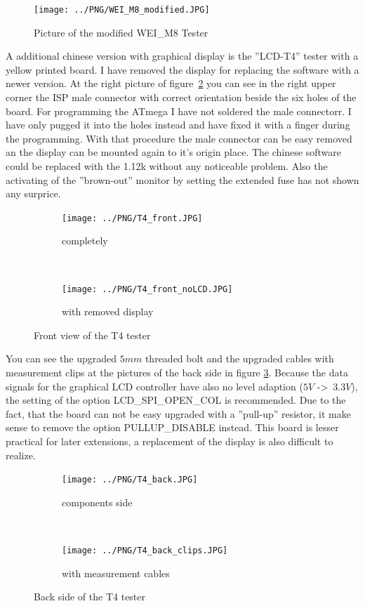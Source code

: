 \begin{figure}[H]
\centering
\texttt{[image: ../PNG/WEI\_M8\_modified.JPG]}
\caption{Picture of the modified WEI\_M8 Tester}
\label{fig:WeiM8mod}
\end{figure}

A additional chinese version with graphical display is the ''LCD-T4'' tester with a yellow 
printed board.
I have removed the display for replacing the software with a newer version.
At the right picture of figure~\ref{fig:T4_front} you can see in the right upper corner the ISP male connector
with correct orientation beside the six holes of the board.
For programming the ATmega I have not soldered the male connectorr. I have only pugged it into
the holes instead and have fixed it with a finger during the programming.
With that procedure the male connector can be easy removed an the display can be mounted again to
it's origin place.
The chinese software could be replaced with the 1.12k without any noticeable problem. 
Also the activating of the ''brown-out'' monitor by setting the extended fuse has not
shown any surprice.

\begin{figure}[H]
  \begin{subfigure}[b]{9cm}
    \centering
    \texttt{[image: ../PNG/T4\_front.JPG]}
    \caption{completely}
  \end{subfigure}
  ~
  \begin{subfigure}[b]{9cm}
    \centering
    \texttt{[image: ../PNG/T4\_front\_noLCD.JPG]}
    \caption{with removed display}
  \end{subfigure}
  \caption{Front view of the T4 tester}
  \label{fig:T4_front}
\end{figure}

You can see the upgraded \(5mm\) threaded bolt and the upgraded cables with measurement clips
at the pictures of the back side in figure \ref{fig:T4_back}.
Because the data signals for the graphical LCD controller have also no
level adaption (\(5V\) -\textgreater~\(3.3V\)), the setting of the option LCD\_SPI\_OPEN\_COL is recommended.
Due to the fact, that the board can not be easy upgraded with a ''pull-up'' resistor,
it make sense to remove the option PULLUP\_DISABLE instead. 
This board is lesser practical for later extensions, a replacement of the display is
also difficult to realize.

\begin{figure}[H]
  \begin{subfigure}[b]{9cm}
    \centering
    \texttt{[image: ../PNG/T4\_back.JPG]}
    \caption{components side}
  \end{subfigure}
  ~
  \begin{subfigure}[b]{9cm}
    \centering
    \texttt{[image: ../PNG/T4\_back\_clips.JPG]}
    \caption{with measurement cables}
  \end{subfigure}
  \caption{Back side of the T4 tester}
  \label{fig:T4_back}
\end{figure}

